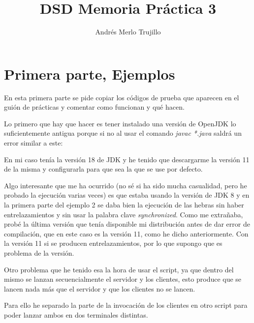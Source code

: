 \documentclass{article}
\title{DSD Memoria Práctica 3}
\author{Andrés Merlo Trujillo}
\date{}
\begin{document}
\maketitle

\section{Primera parte, Ejemplos}
En esta primera parte se pide copiar los códigos de prueba que aparecen en el guión de prácticas y comentar como funcionan y qué hacen.

\bigskip

Lo primero que hay que hacer es tener instalado una versión de OpenJDK lo suficientemente antigua porque si no al usar el comando \textit{javac *.java} saldrá un error similar a este:


En mi caso tenía la versión 18 de JDK y he tenido que descargarme la versión 11 de la misma y configurarla para que sea la que se use por defecto.

\bigskip

Algo interesante que me ha ocurrido (no sé si ha sido mucha casualidad, pero he probado la ejecución varias veces) es que estaba usando la versión de JDK 8 y en la primera parte del ejemplo 2 se daba bien la ejecución de las hebras sin haber entrelazamientos y sin usar la palabra clave \textit{synchronized}. Como me extrañaba, probé la última versión que tenía disponible mi distribución antes de dar error de compilación, que en este caso es la versión 11, como he dicho anteriormente. Con la versión 11 si se producen entrelazamientos, por lo que supongo que es problema de la versión.

\bigskip

Otro problema que he tenido esa la hora de usar el script, ya que dentro del mismo se lanzan secuencialmente el servidor y los clientes, esto produce que se lancen nada más que el servidor y que los clientes no se lancen.

Para ello he separado la parte de la invocación de los clientes en otro script para poder lanzar ambos en dos terminales distintas.
\end{document}
